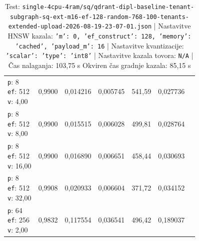 \begin{table}[htbp]
\begin{tabularx}{\textwidth}{Xrrrrrr}
    \makecell{\texttt{p}: 8\\\texttt{ef}: 512\\\texttt{v}: 4,00} & 0,9900 & 0,014216 & 0,005745 & 541,59 & 0,027736 \\
    \makecell{\texttt{p}: 8\\\texttt{ef}: 512\\\texttt{v}: 8,00} & 0,9900 & 0,015515 & 0,006028 & 499,81 & 0,028764 \\
    \makecell{\texttt{p}: 8\\\texttt{ef}: 512\\\texttt{v}: 16,00} & 0,9900 & 0,016890 & 0,006651 & 458,44 & 0,030693 \\
    \makecell{\texttt{p}: 8\\\texttt{ef}: 512\\\texttt{v}: 32,00} & 0,9908 & 0,020933 & 0,006604 & 371,72 & 0,034152 \\
    \makecell{\texttt{p}: 64\\\texttt{ef}: 256\\\texttt{v}: 2,00} & 0,9832 & 0,117554 & 0,036541 & 496,42 & 0,189037 \\
    \bottomrule
  \end{tabularx}
\caption* {Test: \texttt{single-4cpu-4ram/sq/qdrant-dipl-baseline-tenant-subgraph-sq-ext-m16-ef-128-random-768-100-tenants-extended-upload-2026-08-19-23-07-01.json} | Nastavitve HNSW kazala: \texttt{{'m': 0, 'ef\_construct': 128, 'memory': 'cached', 'payload\_m': 16}} | Nastavitve kvantizacije: \texttt{{'scalar': {'type': 'int8'}}} | Nastavitve kazala tovora: \texttt{N/A} | Čas nalaganja: 103,75 s Okviren čas gradnje kazala: 85,15 s}\end{table}



